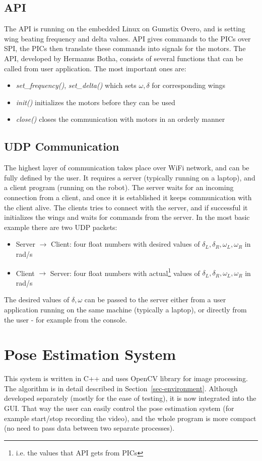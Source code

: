 \begin{appendix}
\subsection{API}
\label{subsec-api}
The API is running on the embedded Linux on Gumstix Overo, and is setting wing beating frequency and delta values. API gives commands to the PICs over SPI, the PICs then translate these commands into signals for the motors. The API, developed by Hermanus Botha, consists of several functions that can be called from user application. The most important ones are:
\begin{itemize}
\item \textit{set\_frequency()}, \textit{set\_delta()} which sets $\omega, \delta$ for corresponding wings
\item \textit{init()} initializes the motors before they can be used
\item \textit{close()} closes the communication with motors in an orderly manner
\end{itemize}

\subsection{UDP Communication}
The highest layer of communication takes place over WiFi network, and can be fully defined by the user. It requires a server (typically running on a laptop), and a client program (running on the robot). The server waits for an incoming connection from a client, and once it is established it keeps communication with the client alive. The clients tries to connect with the server, and if successful it initializes the wings and waits for commands from the server. In the most basic example there are two UDP packets:
\begin{itemize}
\item Server $\rightarrow$ Client: four float numbers with desired values of $\delta_L, \delta_R, \omega_L, \omega_R$ in rad/s
\item Client $\rightarrow$ Server: four float numbers with actual\footnote{i.e. the values that API gets from PICs} values of $\delta_L, \delta_R, \omega_L, \omega_R$ in rad/s
\end{itemize}

The desired values of $\delta, \omega$ can be passed to the server either from a user application running on the same machine (typically a laptop), or directly from the user - for example from the console. 


\section{Pose Estimation System}
This system is written in C++ and uses OpenCV library for image processing. The algorithm is in detail described in Section~\ref{sec-environment}. Although developed separately (mostly for the ease of testing), it is now integrated into the GUI. That way the user can easily control the pose estimation system (for example start/stop recording the video), and the whole program is more compact (no need to pass data between two separate processes).


\end{appendix}

